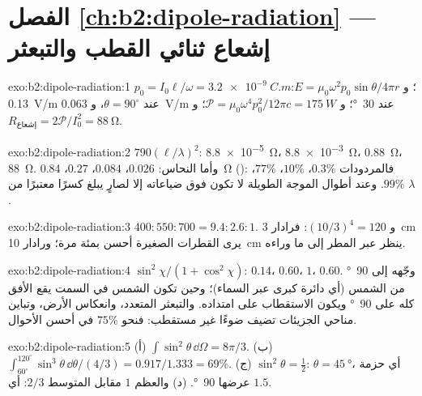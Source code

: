 \section*{الفصل \ref{ch:b2:dipole-radiation} --- إشعاع ثنائي القطب والتبعثر}

\begin{solution}{exo:b2:dipole-radiation:1}
$p_0 = I_0\ell/\omega = \qty{3.2e-9}{C.m}$؛ و $E = \mu_0\omega^2p_0\sin\theta/4\pi r$: \qty{0.13}{V/m}
عند $\theta = 90^\circ$، و \qty{0.063}{V/m} عند \qty{30}{\degree}؛ و $\mathcal P = \mu_0\omega^4p_0^2/12\pi c =
\qty{175}{W}$؛ و $R_{\text{إشعاع}} = 2\mathcal P/I_0^2 = \qty{88}{\ohm}$.
\end{solution}

\begin{solution}{exo:b2:dipole-radiation:2}
$790(\ell/\lambda)^2$: \qty{8.8e-5}{\ohm}، \qty{8.8e-3}{\ohm}، \qty{0.88}{\ohm}، \qty{88}{\ohm}. وأما النحاس:
$0.026$، $0.084$، $0.27$، \qty{0.84}{\ohm} (): فالمردودات $0.3\%$، $10\%$،
$77\%$، $99\%$. وعند أطوال الموجة الطويلة لا تكون  فوق ضياعاته إلا
لصارٍ يبلغ كسرًا معتبرًا من $\lambda$.
\end{solution}

\begin{solution}{exo:b2:dipole-radiation:3}
$400 : 550 : 700 = 9.4 : 2.6 : 1$. و $(10/3)^4 = 120$: فرادار \qty{3}{cm}
يرى القطرات الصغيرة أحسن بمئة مرة؛ ورادار \qty{10}{cm} ينظر
عبر المطر إلى ما وراءه.
\end{solution}

\begin{solution}{exo:b2:dipole-radiation:4}
$\sin^2\chi/(1 + \cos^2\chi)$: $0.14$، $0.60$، $1$، $0.60$. وجّهه إلى \qty{90}{\degree} من
الشمس (أي دائرة كبرى عبر السماء)؛ وحين تكون الشمس في السمت يقع الأفق
كله على \qty{90}{\degree} ويكون الاستقطاب على امتداده. والتبعثر المتعدد،
وانعكاس الأرض، وتباين مناحي الجزيئات تضيف ضوءًا غير
مستقطب: فنحو $75\%$ في أحسن الأحوال.
\end{solution}

\begin{solution}{exo:b2:dipole-radiation:5}
(أ) $\int\sin^2\theta\,\dd\Omega = 8\pi/3$. (ب) $\int_{60^\circ}^{120^\circ}\sin^3\theta\,\dd\theta/
(4/3) = 0.917/1.333 = 69\%$. (ج) $\sin^2\theta = \tfrac12$: $\theta = \qty{45}{\degree}$، أي
حزمة عرضها \qty{90}{\degree}. (د) والعظم $1$ مقابل المتوسط $2/3$: أي $1.5$.
\end{solution}

